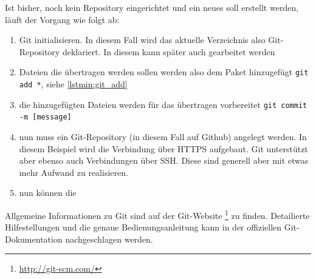 \documentclass[12pt, twoside, a4paper, ngerman]{article}
\newcommand{\iz}[2]{#1 {\renewcommand{\baselinestretch}{1}\footnote{#2}}} %
\renewcommand{\baselinestretch}{1.5}
\begin{document}
Ist bisher, noch kein Repository eingerichtet und ein neues soll erstellt werden, läuft der Vorgang wie folgt ab:

\begin{enumerate}

  \item Git initialisieren. In diesem Fall wird das aktuelle Verzeichnis also Git-Repository deklariert. In diesem kann später auch gearbeitet werden

	

  \item Dateien die übertragen werden sollen werden also dem Paket hinzugefügt \texttt{git add *}, siehe \ref{lstmin:git_add}
  
  \item die hinzugefügten Dateien werden für das übertragen vorbereitet \texttt{git commit -m [message]}
  
  \item nun muss ein Git-Repository (in diesem Fall auf Github) angelegt werden. In diesem Beispiel wird die Verbindung über \gls{HTTPS} aufgebaut. Git unterstützt aber ebenso auch Verbindungen über SSH. Diese sind generell aber mit etwas mehr Aufwand zu realisieren.   
  
	

  
  \item nun können die 
  
   
\end{enumerate}   
   
Allgemeine Informationen zu Git sind auf der \iz{Git-Website}{\url{http://git-scm.com/}} zu finden. Detailierte Hilfestellungen und die genaue Bedienungsanleitung kann in der offiziellen Git-Dokumentation \cite{GitDoku} nachgeschlagen werden. 
   
\end{document}
